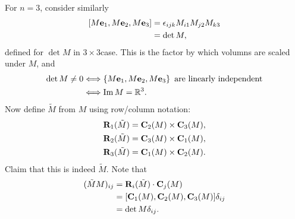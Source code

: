 \documentclass[10pt]{article}
\DeclareMathOperator{\im}{Im}
\begin{document}
    For $n=3$, consider similarly 
    \[
        \begin{aligned}
            [M\bfe_1, M\bfe_2, M\bfe_3]&= \epsilon_{ijk}M_{i1}M_{j2}M_{k3}\\
            &= \det M,
        \end{aligned}
    \]
    defined for $ \det M $ in $ 3 \times 3 $case. This is the factor by which volumns are scaled under $M$, and 
    \[
        \begin{aligned}
            \det M\neq 0 &\Longleftrightarrow \left\{ M \mathbf{e}_1, M\bfe_2,M\bfe_3\right\} \text{ are linearly independent}\\
            & \Longleftrightarrow \im M=\mathbb{R}^{3}.
        \end{aligned}
    \]
    Now define $ \tilde{M} $ from $M$ using row/column notation:
    \[
        \begin{aligned}
            &\mathbf{R}_1(\tilde{M})={\bf C}_2(M)\times {\bf C}_3(M),
            \\
            &\mathbf{R}_2(\tilde{M})={\bf C}_3(M)\times {\bf C}_1(M),
            \\
            &\mathbf{R}_3(\tilde{M})={\bf C}_1(M)\times {\bf C}_2(M).
        \end{aligned}
    \]
    Claim that this is indeed $ \tilde{M} $. Note that 
    \[
        \begin{aligned}
            (\tilde{M}M)_{ij}&=\mathbf{R}_i(\tilde{M}) \cdot \mathbf{C}_j(M)\\
            &=[{\bf C}_1(M),{\bf C}_2(M),{\bf C}_3(M)]\delta_{ij}\\
            &=\det M \delta_{ij}.
        \end{aligned}
    \]
\end{document}
